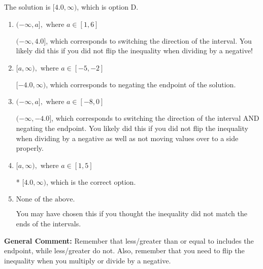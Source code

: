 \documentclass{extbook}[14pt]
\begin{document}
\begin{enumerate}
{The solution is \( [4.0, \infty) \), which is option D.\begin{enumerate}[label=\Alph*.]
\item \( (-\infty, a], \text{ where } a \in [1, 6] \)

 $(-\infty, 4.0]$, which corresponds to switching the direction of the interval. You likely did this if you did not flip the inequality when dividing by a negative!
\item \( [a, \infty), \text{ where } a \in [-5, -2] \)

 $[-4.0, \infty)$, which corresponds to negating the endpoint of the solution.
\item \( (-\infty, a], \text{ where } a \in [-8, 0] \)

 $(-\infty, -4.0]$, which corresponds to switching the direction of the interval AND negating the endpoint. You likely did this if you did not flip the inequality when dividing by a negative as well as not moving values over to a side properly.
\item \( [a, \infty), \text{ where } a \in [1, 5] \)

* $[4.0, \infty)$, which is the correct option.
\item \( \text{None of the above}. \)

You may have chosen this if you thought the inequality did not match the ends of the intervals.
\end{enumerate}

\textbf{General Comment:} Remember that less/greater than or equal to includes the endpoint, while less/greater do not. Also, remember that you need to flip the inequality when you multiply or divide by a negative.
}
\end{enumerate}
\end{document}

